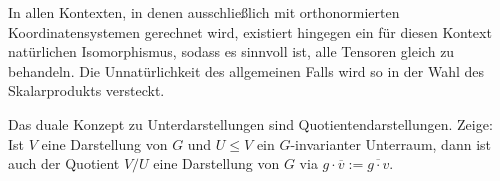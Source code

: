\begin{sheet}
\begin{remark}
In allen Kontexten, in denen ausschließlich mit orthonormierten Koordinatensystemen gerechnet wird, existiert hingegen ein für diesen Kontext natürlichen Isomorphismus, sodass es sinnvoll ist, alle Tensoren gleich zu behandeln. Die Unnatürlichkeit des allgemeinen Falls wird so in der Wahl des Skalarprodukts versteckt.
\end{remark}

\begin{problem}[title={Quotienten}]
Das duale Konzept zu Unterdarstellungen sind Quotientendarstellungen. Zeige: Ist $V$ eine Darstellung von $G$ und $U\leq V$ ein $G$-invarianter Unterraum, dann ist auch der Quotient $V/U$ eine Darstellung von $G$ via $g\cdot\overline{v} := \overline{g\cdot v}$.
\end{problem}
	
\end{sheet}